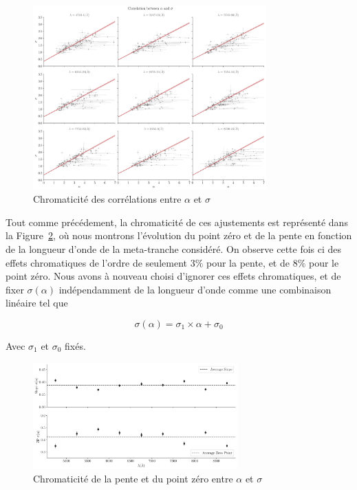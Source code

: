 \documentclass[../main/main.tex]{subfiles}
\begin{document}
\begin{figure}[ht]
  \centering
  \includegraphics[width=0.8\textwidth]{../figures/06_irf/STD_alpha_sigma_chromatic_corr.pdf}
  \caption[Chromaticité des corrélations entre $\alpha$ et $\sigma$]{Chromaticité des corrélations entre $\alpha$ et $\sigma$}
  \label{fig:alphasigmachromcorr}
\end{figure}

Tout comme précédement, la chromaticité de ces ajustements est représenté dans la
Figure~\ref{fig:chromslope_zp_alphasigma}, où nous montrons l'évolution
du point zéro et de la pente en fonction de la
longueur d'onde de la meta-tranche considéré. On observe cette fois ci des effets
chromatiques de l'ordre de seulement $3\%$ pour la pente, et de $8\%$ pour le
point zéro.
Nous avons à nouveau choisi d'ignorer ces effets chromatiques, et de fixer
$\sigma(\alpha)$ indépendamment de la longueur d'onde comme une
combinaison linéaire tel que

\begin{equation}
  \label{eq:betaalpha}
  \sigma(\alpha) = \sigma_{1}\times \alpha + \sigma_{0}
\end{equation}

Avec $\sigma_{1}$ et $\sigma_{0}$ fixés.

\begin{figure}[ht]
  \centering
  \includegraphics[width=0.7\textwidth]{../figures/06_irf/chromaticitysigma_alpha_corr.pdf}
  \caption[Chromaticité de la pente et du point zéro entre $\alpha$ et $\sigma$]{Chromaticité de la pente et du point zéro entre $\alpha$ et $\sigma$}
  \label{fig:chromslope_zp_alphasigma}
\end{figure}
\end{document}
